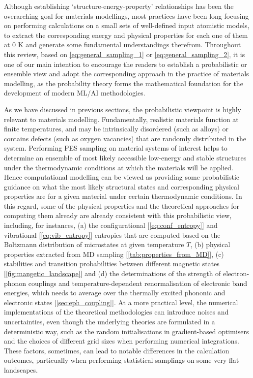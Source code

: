 
Although establishing `structure-energy-property' relationships has been the overarching goal for materials modellings, most practices have been long focusing on performing calculations on a small sets of well-defined input atomistic models, to extract the corresponding energy and physical properties for each one of them at 0 K and generate some fundamental understandings therefrom. Throughout this review, based on \cref{eq:general_sampling_1} or \cref{eq:general_sampling_2}, it is one of our main intention to encourage the readers to establish a probabilistic or ensemble view and adopt the corresponding approach in the practice of materials modelling, as the probability theory forms the mathematical foundation for the development of modern ML/AI methodologies.

As we have discussed in previous sections, the probabilistic viewpoint is highly relevant to materials modelling. Fundamentally, realistic materials function at finite temperatures, and may be intrinsically disordered (such as alloys) or contains defects (such as oxygen vacancies) that are randomly distributed in the system. Performing PES sampling on material systems of interest helps to determine an ensemble of most likely accessible low-energy and stable structures under the thermodynamic conditions at which the materials will be applied. Hence computational modelling can be viewed as providing some probabilistic guidance on what the most likely structural states and corresponding physical properties are for a given material under certain thermodynamic conditions. In this regard, some of the physical properties and the theoretical approaches for computing them already are already consistent with this probabilistic view, including, for instances, (a) the configurational [\cref{eq:conf_entropy}] and vibrational [\cref{eq:vib_entropy}] entropies that are computed based on the Boltzmann distribution of microstates at given temperature $T$, (b) physical properties extracted from MD sampling [\cref{tab:properties_from_MD}], (c) stabilities and transition probabilities between different magnetic states [\cref{fig:mangetic_landscape}] and (d) the determinations of the strength of electron-phonon couplings and temperature-dependent renormalisation of electronic band energies, which needs to average over the thermally excited phononic and electronic states [\cref{sec:eph_coupling}]. At a more practical level, the numerical implementations of the theoretical methodologies can introduce noises and uncertainties, even though the underlying theories are formulated in a deterministic way, such as the random initialisations in gradient-based optimisers and the choices of different grid sizes when performing numerical integrations. These factors, sometimes, can lead to notable differences in the calculation outcomes, particually when performing statistical samplings on some very flat landscapes. 

